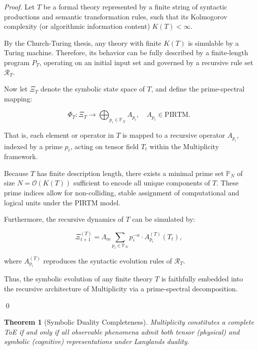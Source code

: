 \documentclass{article}
\theoremstyle{plain}
\newtheorem{theorem}{Theorem}
\begin{document}
\begin{proof}
Let \( T \) be a formal theory represented by a finite string of syntactic productions and semantic transformation rules, such that its Kolmogorov complexity (or algorithmic information content) \( K(T) < \infty \).

By the Church-Turing thesis, any theory with finite \( K(T) \) is simulable by a Turing machine. Therefore, its behavior can be fully described by a finite-length program \( P_T \), operating on an initial input set and governed by a recursive rule set \( \mathcal{R}_T \).

Now let \( \Xi_T \) denote the symbolic state space of \( T \), and define the prime-spectral mapping:

\[
\Phi_T: \Xi_T \rightarrow \bigoplus_{p_i \in \mathbb{P}_N} A_{p_i}, \quad A_{p_i} \in \text{PIRTM}.
\]

That is, each element or operator in \( T \) is mapped to a recursive operator \( A_{p_i} \), indexed by a prime \( p_i \), acting on tensor field \( T_t \) within the Multiplicity framework.

Because \( T \) has finite description length, there exists a minimal prime set \( \mathbb{P}_N \) of size \( N = \mathcal{O}(K(T)) \) sufficient to encode all unique components of \( T \). These prime indices allow for non-colliding, stable assignment of computational and logical units under the PIRTM model.

Furthermore, the recursive dynamics of \( T \) can be simulated by:

\[
\Xi_{t+1}^{(T)} = \Lambda_m \sum_{p_i \in \mathbb{P}_N} p_i^{-\alpha} \cdot A_{p_i}^{(T)}(T_t),
\]

where \( A_{p_i}^{(T)} \) reproduces the syntactic evolution rules of \( \mathcal{R}_T \).

Thus, the symbolic evolution of any finite theory \( T \) is faithfully embedded into the recursive architecture of Multiplicity via a prime-spectral decomposition.

\qed
\end{proof}

\begin{theorem}[Symbolic Duality Completeness]
Multiplicity constitutes a complete ToE if and only if all observable phenomena admit both tensor (physical) and symbolic (cognitive) representations under Langlands duality.
\end{theorem}
\end{document}
